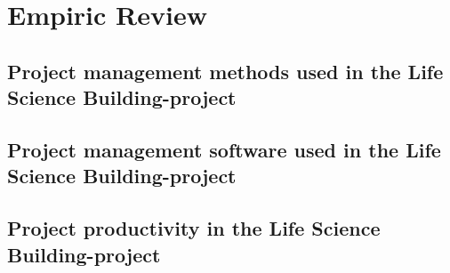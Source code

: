 
\chapter{Empiric Review}
\section{Project management methods used in the Life Science Building-project}
\section{Project management software used in the Life Science Building-project}
\section{Project productivity in the Life Science Building-project}

\cleardoublepage